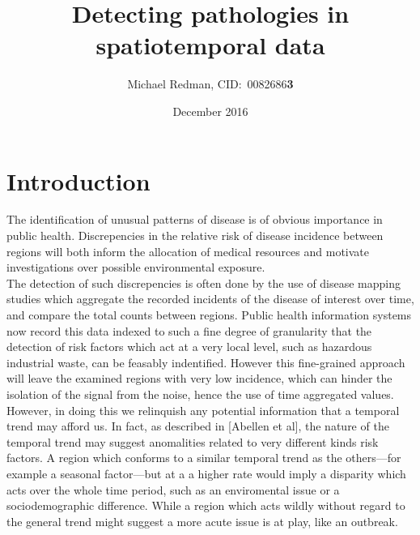 \documentclass{article}
\begin{document}
\title{Detecting pathologies in spatiotemporal data}
\author{Michael Redman, CID:\ 0082686\textbf{3}}
\date{December 2016}

\maketitle

\section{Introduction}

The identification of unusual patterns of disease is of obvious importance in public health. Discrepencies in the relative risk of disease incidence between regions will both inform the allocation of medical resources and motivate investigations over possible environmental exposure. \\

 The detection of such discrepencies is often done by the use of disease mapping studies which aggregate the recorded incidents of the disease of interest over time, and compare the total counts between regions. Public health information systems now record this data indexed to such a fine degree of granularity that the detection of risk factors which act at a very local level, such as hazardous industrial waste, can be feasably indentified. However this fine-grained approach will leave the examined regions with very low incidence, which can hinder the isolation of the signal from the noise, hence the use of time aggregated values. However, in doing this we relinquish any potential information that a temporal trend may afford us. In fact, as described in [Abellen et al], the nature of the temporal trend may suggest anomalities related to very different kinds risk factors. A region which conforms to a similar temporal trend as the others---for example a seasonal factor---but at a a higher rate would imply a disparity which acts over the whole time period, such as an enviromental issue or a sociodemographic difference. While a region which acts wildly without regard to the general trend might suggest a more acute issue is at play, like an outbreak. \\
\end{document}
